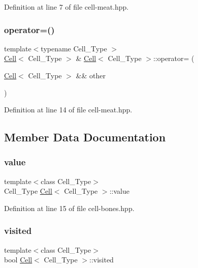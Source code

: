 Definition at line 7 of file cell-\/meat.\+hpp.

\mbox{\label{class_cell_a775ee69aabe8581d9fb2a3729d49a5df}} 
\subsubsection{\texorpdfstring{operator=()}{operator=()}\hspace{0.1cm}{\footnotesize\ttfamily [2/2]}}
{\footnotesize\ttfamily template$<$typename Cell\+\_\+\+Type $>$ \\
\hyperlink{class_cell}{Cell}$<$ Cell\+\_\+\+Type $>$ \& \hyperlink{class_cell}{Cell}$<$ Cell\+\_\+\+Type $>$\+::operator= (\begin{DoxyParamCaption}\item[{\hyperlink{class_cell}{Cell}$<$ Cell\+\_\+\+Type $>$ \&\&}]{other }\end{DoxyParamCaption})}



Definition at line 14 of file cell-\/meat.\+hpp.



\subsection{Member Data Documentation}
\mbox{\label{class_cell_a5df1609bc0705830ec4dc6e177ddc955}} 
\subsubsection{\texorpdfstring{value}{value}}
{\footnotesize\ttfamily template$<$class Cell\+\_\+\+Type$>$ \\
Cell\+\_\+\+Type \hyperlink{class_cell}{Cell}$<$ Cell\+\_\+\+Type $>$\+::value}



Definition at line 15 of file cell-\/bones.\+hpp.

\mbox{\label{class_cell_a1f539a05953fa05d723c32e718f0eeb3}} 
\subsubsection{\texorpdfstring{visited}{visited}}
{\footnotesize\ttfamily template$<$class Cell\+\_\+\+Type$>$ \\
bool \hyperlink{class_cell}{Cell}$<$ Cell\+\_\+\+Type $>$\+::visited}



